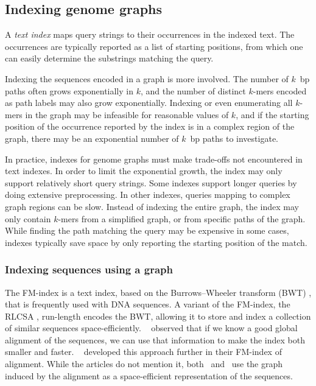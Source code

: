 \subsection{Indexing genome graphs}

A \emph{text index} maps query strings to their occurrences in the indexed text.
The occurrences are typically reported as a list of starting positions, from which one can easily determine the substrings matching the query.

Indexing the sequences encoded in a graph is more involved.
The number of $k$~bp paths often grows exponentially in $k$, and the number of distinct $k$-mers encoded as path labels may also grow exponentially.
Indexing or even enumerating all $k$-mers in the graph may be infeasible for reasonable values of $k$, and if the starting position of the occurrence reported by the index is in a complex region of the graph, there may be an exponential number of $k$~bp paths to investigate.

In practice, indexes for genome graphs must make trade-offs not encountered in text indexes.
In order to limit the exponential growth, the index may only support relatively short query strings.
Some indexes support longer queries by doing extensive preprocessing.
In other indexes, queries mapping to complex graph regions can be slow.
Instead of indexing the entire graph, the index may only contain $k$-mers from a simplified graph, or from specific paths of the graph.
While finding the path matching the query may be expensive in some cases, indexes typically save space by only reporting the starting position of the match.

\subsubsection{Indexing sequences using a graph}

The FM-index \cite{Ferragina_2005} is a text index, based on the Burrows--Wheeler transform (BWT) \cite{Burrows_1994}, that is frequently used with DNA sequences.
A variant of the FM-index, the RLCSA \cite{Maekinen_2010}, run-length encodes the BWT, allowing it to store and index a collection of similar sequences space-efficiently.
\citeauthor{Huang_2010}\ \cite{Huang_2010} observed that if we know a good global alignment of the sequences, we can use that information to make the index both smaller and faster.
\citeauthor{Na_2016}\ \cite{Na_2016,Na_2018} developed this approach further in their FM-index of alignment.
While the articles do not mention it, both \citeauthor{Huang_2010}\ and \citeauthor{Na_2016}\ use the graph induced by the alignment as a space-efficient representation of the sequences.

